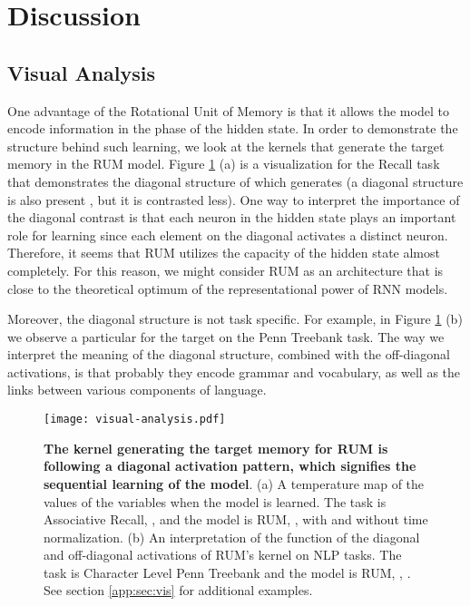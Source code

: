 \documentclass{article} \usepackage{iclr2018_conference,times}
\begin{document}
\section{Discussion}
\subsection{Visual Analysis} \label{main:sec:va}
One advantage of the Rotational Unit of Memory is that it allows the model to encode information in the phase of the hidden state. In order to demonstrate the structure behind such learning, we look at the kernels that generate the target memory  in the RUM model. Figure \ref{main:fig:visual-analysis} (a) is a visualization for the Recall task that demonstrates the diagonal structure of  which generates  (a diagonal structure is also present , but it is contrasted less). One way to interpret the importance of the diagonal contrast is that each neuron in the hidden state plays an important role for learning since each element on the diagonal activates a distinct neuron. Therefore, it seems that RUM utilizes the capacity of the hidden state almost completely. For this reason, we might consider RUM as an architecture that is close to the theoretical optimum of the representational power of RNN models.  

Moreover, the diagonal structure is not task specific. For example, in Figure \ref{main:fig:visual-analysis} (b) we observe a particular  for the target  on the Penn Treebank task. The way we interpret the meaning of the diagonal structure, combined with the off-diagonal activations, is that probably they encode grammar and vocabulary, as well as the links between various components of language.


\begin{figure}[h]
\begin{center}
\texttt{[image: visual-analysis.pdf]}
\end{center}
\caption{\textbf{The kernel generating the target memory for RUM is following a diagonal activation pattern, which signifies the sequential learning of the model}. (a) A temperature map of the values of the variables when the model is learned. The task is Associative Recall, , and the model is RUM, , with  and without time normalization. (b) An interpretation of the function of the diagonal and off-diagonal activations of RUM's  kernel on NLP tasks. The task is Character Level Penn Treebank and the model is  RUM, , . See section \ref{app:sec:vis} for additional examples.
\label{main:fig:visual-analysis}}
\end{figure}
\end{document}
